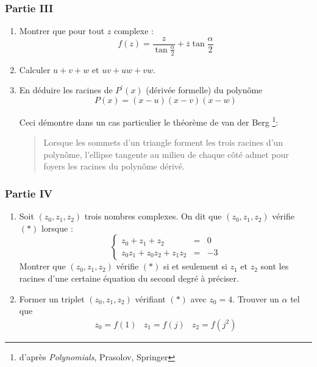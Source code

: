 \subsubsection*{Partie III}
\begin{enumerate}
 \item Montrer que pour tout $z$ complexe :
\[f(z)=\frac{z}{\tan \frac{\alpha}{2}}+\overline{z}\tan \frac{\alpha}{2}\]
\item Calculer $u+v+w$  et $uv+uw+vw$.
\item En déduire les racines de $P^\prime(x)$ (dérivée formelle) du polynôme
\[P(x)=(x-u)(x-v)(x-w)\] 

Ceci démontre dans un cas particulier le théorème de van der Berg \footnote{d'après \emph{Polynomials}, Prasolov, Springer}:
\begin{quote}
 Lorsque les sommets d'un triangle forment les trois racines d'un polynôme, l'ellipse tangente au milieu de chaque côté admet pour foyers les racines du polynôme dérivé.
\end{quote} 
\end{enumerate}

\subsubsection*{Partie IV}
\begin{enumerate}
 \item Soit $(z_0,z_1,z_2)$ trois nombres complexes. On dit que $(z_0,z_1,z_2)$ vérifie $(*)$ lorsque :
\begin{displaymath}
\left\lbrace \begin{array}{lll}
z_0+z_1+z_2 & = & 0 \\ 
z_0z_1+z_0z_2+z_1z_2 & = & -3
\end{array} \right. 
\end{displaymath}
Montrer que $(z_0,z_1,z_2)$ vérifie $(*)$ si et seulement si $z_1$ et $z_2$ sont les racines d'une certaine équation du second degré à préciser.
\item Former un triplet $(z_0,z_1,z_2)$ vérifiant $(*)$ avec $z_0=4$. Trouver un $\alpha$ tel que
\[\begin{array}{ccc}
z_0=f(1) & z_1=f(j) &z_2=f(j^2)
\end{array}
\]
\end{enumerate}


